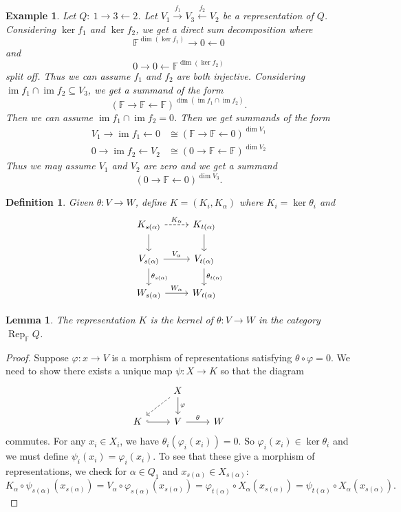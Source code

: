 \documentclass{book}
\newtheorem{lemma}[theorem]{Lemma}
\newtheorem{definition}[theorem]{Definition}
\newtheorem{example}{Example}[section]
\DeclareMathOperator{\Rep}{Rep}
\DeclareMathOperator{\im}{im}
\begin{document}
		\begin{example}
			Let $Q: \ 1\to3\leftarrow 2$. Let $V_1 \xrightarrow{f_1} V_3 \xleftarrow{f_2} V_2$ be a representation of $Q$. Considering $\ker f_1$ and $\ker f_2$, we get a direct sum decomposition where  $$\mathbb{F}^{\dim(\ker f_1)} \rightarrow 0 \leftarrow 0$$ and $$ 0\rightarrow 0 \leftarrow \mathbb{F}^{\dim(\ker f_2)}$$ split off. Thus we can assume $f_1$ and $f_2$ are both injective. Considering $\im f_1\cap \im f_2 \subseteq V_3$, we get a summand of the form \[(\mathbb{F}\rightarrow\mathbb{F}\leftarrow\mathbb{F})^{\dim(\im f_1\cap \im f_2)}.\] Then we can assume $\im f_1\cap \im f_2=0$. Then we get summands of the form 
			\begin{align*} V_1\rightarrow\im f_1 \leftarrow 0 &\cong (\mathbb{F}\rightarrow\mathbb{F}\leftarrow 0)^{\dim V_1} \\ 0\rightarrow\im f_2 \leftarrow V_2 &\cong (0 \rightarrow\mathbb{F}\leftarrow\mathbb{F})^{\dim V_2} \end{align*}
			Thus we may assume $V_1$ and $V_2$ are zero and we get a summand \[(0 \rightarrow\mathbb{F}\leftarrow0)^{\dim V_3}. \]
		\end{example}
		
		\begin{definition}
			Given $\theta:V\to W$, define $K=(K_i,K_\alpha)$ where $K_i=\ker\theta_i$ and \[ \begin{tikzcd}
		K_{s(\alpha)} \arrow[dashed]{r}{K_\alpha} \arrow{d} & K_{t(\alpha)} \arrow{d}\\
		V_{s(\alpha)} \arrow{r}{V_\alpha} \arrow{d}{\theta_{s(\alpha)}} & V_{t(\alpha)} \arrow{d}{\theta_{t(\alpha)}}\\
		W_{s(\alpha)} \arrow{r}{W_\alpha}& W_{t(\alpha)}
		\end{tikzcd}\]
		\end{definition}
		
		
		\begin{lemma}
			The representation $K$ is the kernel of $\theta:V\to W$ in the category $\Rep_\mathbb{F}Q$.
		\end{lemma}
		
		\begin{proof}
		    Suppose $\varphi:x\to V$ is a morphism of representations satisfying $\theta\circ\varphi=0$. We need to show there exists a unique map $\psi:X\to K$ so that the diagram 
		    \[ \begin{tikzcd}
		    & X \arrow[dashed]{dl} \arrow{d}{\varphi}&\\
		    K\arrow[hookrightarrow]{r} & V \arrow{r}{\theta} & W 
		    \end{tikzcd}\]
		    commutes. For any $x_i\in X_i$, we have $\theta_i(\varphi_i(x_i))=0$. So $\varphi_i(x_i)\in\ker\theta_i$ and we must define $\psi_i(x_i)=\varphi_i(x_i)$. To see that these give a morphism of representations, we check for $\alpha\in Q_1$ and $x_{s(\alpha)}\in X_{s(\alpha)}$:
		    \[K_\alpha\circ\psi_{s(\alpha)}(x_{s(\alpha)})=V_\alpha\circ\varphi_{s(\alpha)}(x_{s(\alpha)})=\varphi_{t(\alpha)}\circ X_\alpha(x_{s(\alpha)})=\psi_{t(\alpha)}\circ X_\alpha(x_{s(\alpha)}).\]
		\end{proof}
		
\end{document}
